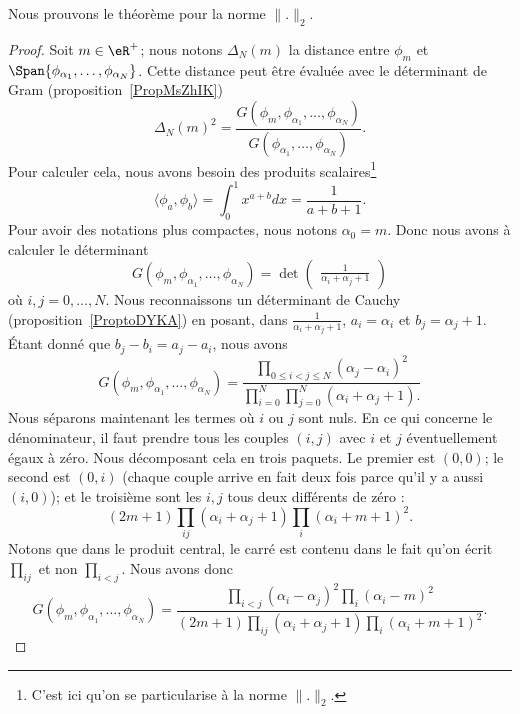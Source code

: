 Nous prouvons le théorème pour la norme \( \| . \|_2\).
\begin{proof}
	Soit \( m\in \eR^+\); nous notons \( \Delta_N(m)\) la distance entre \( \phi_m\) et \( \Span\{ \phi_{\alpha_1},\ldots, \phi_{\alpha_N} \}\). Cette distance peut être évaluée avec le déterminant de Gram (proposition~\ref{PropMsZhIK})
	\begin{equation}
		\Delta_N(m)^2=\frac{ G(\phi_m,\phi_{\alpha_1},\ldots, \phi_{\alpha_N}) }{ G(\phi_{\alpha_1},\ldots, \phi_{\alpha_N}) }.
	\end{equation}
	Pour calculer cela, nous avons besoin des produits scalaires\footnote{C'est ici qu'on se particularise à la norme \( \| . \|_2\).}
	\begin{equation}
		\langle \phi_a, \phi_b\rangle =\int_0^1 x^{a+b}dx=\frac{1}{ a+b+1 }.
	\end{equation}
	Pour avoir des notations plus compactes, nous notons \( \alpha_0=m\). Donc nous avons à calculer le déterminant
	\begin{equation}
		G(\phi_m,\phi_{\alpha_1},\ldots, \phi_{\alpha_N})=\det\begin{pmatrix}
			\frac{1}{ \alpha_i+\alpha_j+1 }
		\end{pmatrix}
	\end{equation}
	où \( i,j=0,\ldots, N\). Nous reconnaissons un déterminant de Cauchy (proposition~\ref{ProptoDYKA}) en posant, dans \( \frac{1}{ \alpha_i+\alpha_j+1 }\), \( a_i=\alpha_i\) et \( b_j=\alpha_j+1\). Étant donné que \( b_j-b_i=a_j-a_i\), nous avons
	\begin{equation}
		G(\phi_m,\phi_{\alpha_1},\ldots, \phi_{\alpha_N})=\frac{ \prod_{0\leq i<j\leq N}  (\alpha_j-\alpha_i)^2 }{ \prod_{i=0}^N\prod_{j=0}^N (\alpha_i+\alpha_j+1).}
	\end{equation}
	Nous séparons maintenant les termes où \( i\) ou \( j\) sont nuls. En ce qui concerne le dénominateur, il faut prendre tous les couples \( (i,j)\) avec \( i\) et \( j\) éventuellement égaux à zéro. Nous décomposant cela en trois paquets. Le premier est \( (0,0)\); le second est \( (0,i)\) (chaque couple arrive en fait deux fois parce qu'il y a aussi \( (i,0)\)); et le troisième sont les \( i,j\) tous deux différents de zéro :
	\begin{equation}
		(2m+1)\prod_{ij}(\alpha_i+\alpha_j+1)\prod_i(\alpha_i+m+1)^2.
	\end{equation}
	Notons que dans le produit central, le carré est contenu dans le fait qu'on écrit \( \prod_{ij}\) et non \( \prod_{i<j}\). Nous avons donc
	\begin{equation}
		G(\phi_m,\phi_{\alpha_1},\ldots, \phi_{\alpha_N})=\frac{ \prod_{i<j}(\alpha_i-\alpha_j)^2\prod_i(\alpha_i-m)^2 }{ (2m+1)\prod_{ij}(\alpha_i+\alpha_j+1)\prod_i(\alpha_i+m+1)^2 }.
	\end{equation}


\end{proof}
